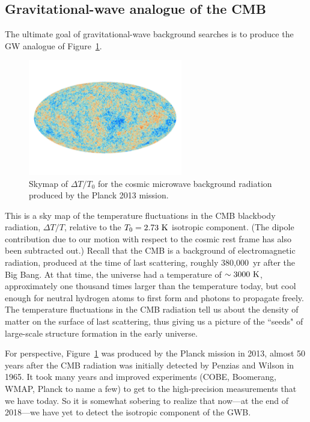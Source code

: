 \documentclass[11pt]{article}
\numberwithin{equation}{section}
\begin{document}
\subsection{Gravitational-wave analogue of the CMB}

The ultimate goal of gravitational-wave background
searches is to produce the GW analogue of Figure~\ref{f:CMB}.
%
\begin{figure}[htbp!]
\begin{center}
\includegraphics[width=0.6\textwidth]{Figures/CMB}
\caption{Skymap of $\Delta T/T_0$ for the cosmic microwave background
radiation produced by the Planck 2013 mission.}
\label{f:CMB}
\end{center}
\end{figure}
%
This is a sky map of the temperature fluctuations in 
the CMB blackbody radiation, $\Delta T/T$, relative 
to the $T_0 = 2.73~{\rm K}$ isotropic component.
(The dipole contribution due to our motion with respect 
to the cosmic rest frame has also been subtracted out.)
Recall that the CMB is a background of electromagnetic
radiation, produced at the time of last scattering,
roughly 380,000~yr after the Big Bang.
At that time, the universe had a temperature of 
$\sim 3000~{\rm K}$, approximately one thousand times 
larger than the temperature today, but cool enough for 
neutral hydrogen atoms to first form and photons to 
propagate freely.
The temperature fluctuations in the CMB radiation tell
us about the density of matter on the surface of last 
scattering, thus giving us a picture of the ``seeds" of 
large-scale structure formation in the early universe.

For perspective, Figure~\ref{f:CMB} was produced by 
the Planck mission in 2013,
almost 50 years after the CMB radiation was initially
detected by Penzias and Wilson in 1965.
It took many years and improved experiments
(COBE, Boomerang, WMAP, Planck to name a few) to get to 
the high-precision measurements that we have today.
So it is somewhat sobering to realize that now---at the 
end of 2018---we have yet to detect the isotropic component 
of the GWB.
\end{document}
